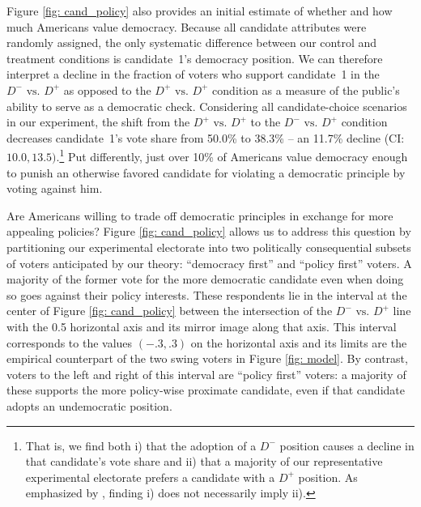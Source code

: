 \documentclass[letterpaper, 12pt]{article}
\begin{document}
\begin{raggedright}
Figure \ref{fig: cand_policy} also provides an initial estimate of whether and how much Americans value democracy. Because all candidate attributes were randomly assigned, the only systematic difference between our control and treatment conditions is candidate~1's democracy position. We can therefore interpret a decline in the fraction of voters who support candidate~1 in the $D^- \text{ vs. } D^+$ as opposed to the $D^+ \text{ vs. } D^+$ condition as a measure of the public's ability to serve as a democratic check. Considering all candidate-choice scenarios in our experiment, the shift from the $D^+ \text{ vs. } D^+$ to the $D^- \text{ vs. } D^+$ condition decreases candidate~1's vote share from 50.0\% to 38.3\% -- an 11.7\% decline (CI: $10.0, 13.5)$.\footnote{That is, we find both i) that the adoption of a $D^-$ position causes a decline in that candidate's vote share and ii) that a majority of our representative experimental electorate prefers a candidate with a $D^+$ position. As emphasized by \citet{Abramson2019}, finding i) does not necessarily imply ii).} Put differently, just over 10\% of Americans value democracy enough to punish an otherwise favored candidate for violating a democratic principle by voting against him.

Are Americans willing to trade off democratic principles in exchange for more appealing policies? Figure \ref{fig: cand_policy} allows us to address this question by partitioning our experimental electorate into two politically consequential subsets of voters anticipated by our theory: ``democracy first'' and ``policy first'' voters. A majority of the former vote for the more democratic candidate even when doing so goes against their policy interests. These respondents lie in the interval at the center of Figure \ref{fig: cand_policy} between the intersection of the $D^- \text{ vs. } D^+$ line with the 0.5 horizontal axis and its mirror image along that axis. This interval corresponds to the values $(-.3, .3)$ on the horizontal axis and its limits are the empirical counterpart of the two swing voters in Figure \ref{fig: model}. By contrast, voters to the left and right of this interval are ``policy first'' voters: a majority of these supports the more policy-wise proximate candidate, even if that candidate adopts an undemocratic position.


\end{raggedright}
\end{document}
